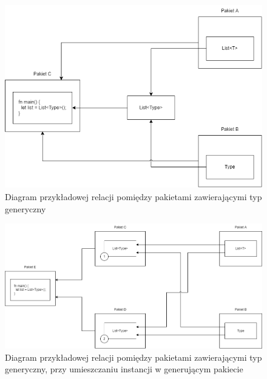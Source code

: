 \begin{figure}
	\caption{Diagram przykładowej relacji pomiędzy pakietami zawierającymi typ generyczny}
	\begin{center}
		\includegraphics[height=8cm]{img/generic_misplaced.png}
	\end{center}
	\label{generic_packages_dependencies}
\end{figure}

\begin{figure}
	\caption{Diagram przykładowej relacji pomiędzy pakietami zawierającymi typ generyczny, przy umieszczaniu instancji w generującym pakiecie}
	\label{generic_packages_dependencies:option:a}
	\begin{center}
		\includegraphics[width=\textwidth]{img/generics_placed_in_a.png}
	\end{center}
\end{figure}

